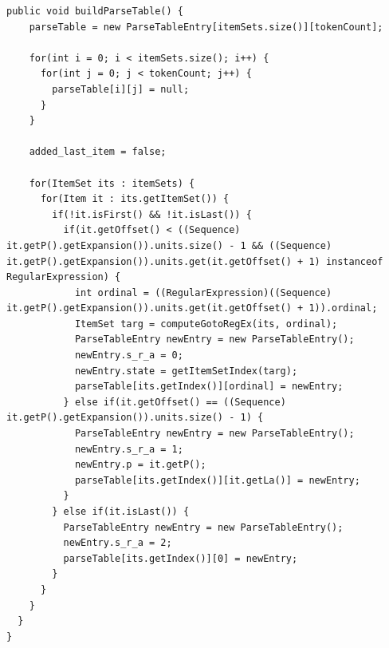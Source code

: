 \documentclass[oneside]{book}
\begin{document}
\begin{lstlisting}
public void buildParseTable() {
    parseTable = new ParseTableEntry[itemSets.size()][tokenCount];
    
    for(int i = 0; i < itemSets.size(); i++) {
      for(int j = 0; j < tokenCount; j++) {
        parseTable[i][j] = null;
      }
    }
    
    added_last_item = false;
    
    for(ItemSet its : itemSets) {
      for(Item it : its.getItemSet()) {
        if(!it.isFirst() && !it.isLast()) {
          if(it.getOffset() < ((Sequence) it.getP().getExpansion()).units.size() - 1 && ((Sequence) it.getP().getExpansion()).units.get(it.getOffset() + 1) instanceof RegularExpression) {
            int ordinal = ((RegularExpression)((Sequence) it.getP().getExpansion()).units.get(it.getOffset() + 1)).ordinal;
            ItemSet targ = computeGotoRegEx(its, ordinal);
            ParseTableEntry newEntry = new ParseTableEntry();
            newEntry.s_r_a = 0;
            newEntry.state = getItemSetIndex(targ);
            parseTable[its.getIndex()][ordinal] = newEntry;  
          } else if(it.getOffset() == ((Sequence) it.getP().getExpansion()).units.size() - 1) {
            ParseTableEntry newEntry = new ParseTableEntry();
            newEntry.s_r_a = 1;
            newEntry.p = it.getP();
            parseTable[its.getIndex()][it.getLa()] = newEntry;
          }
        } else if(it.isLast()) {
          ParseTableEntry newEntry = new ParseTableEntry();
          newEntry.s_r_a = 2;
          parseTable[its.getIndex()][0] = newEntry;
        }
      }
    }
  }  
}
\end{lstlisting}
\end{document}
